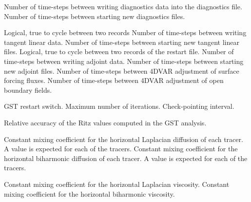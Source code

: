 \begin{klist}
\begin{klist}
             Number of time-steps between writing
     diagnostics data into the diagnostics file.
             Number of time-steps between starting
     new diagnostics files.
     \end{klist}
     \mbox{}
     \begin{klist}
        Logical, true to cycle between two records
             Number of time-steps between writing
     tangent linear data.
             Number of time-steps between starting
     new tangent linear files.
        Logical, true to cycle between two records
     of the restart file.
             Number of time-steps between writing
     adjoint data.
             Number of time-steps between starting
     new adjoint files.
            Number of time-steps between 4DVAR adjustment of
       surface forcing fluxes.
           Number of time-steps between 4DVAR adjustment of
       open boundary fields.
     \end{klist}
     \mbox{}
     \begin{klist}
        GST restart switch.
        Maximum number of iterations.
        Check-pointing interval.
     \end{klist}
     \mbox{}
     \begin{klist}
        Relative accuracy of the Ritz values
       computed in the GST analysis.
     \end{klist}
    \mbox{}
     \begin{klist}
            Constant mixing
     coefficient for the horizontal Laplacian diffusion of each tracer.
     A value is expected for each of the  tracers.
            Constant mixing
     coefficient for the horizontal biharmonic diffusion of each tracer.
     A value is expected for each of the  tracers.
     \end{klist}
    \mbox{}
     \begin{klist}
           Constant mixing coefficient for the horizontal
     Laplacian viscosity.
           Constant mixing coefficient for the horizontal
     biharmonic viscosity.
     \end{klist}

\end{klist}
